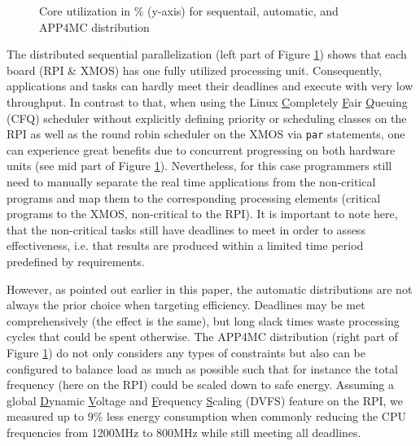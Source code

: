 \documentclass [a4paper,final,conference,10pt]{IDAACS}
\begin{document}
\begin{figure}[t!]
	\vspace{-10pt}
	\caption{Core utilization in \% (y-axis) for sequentail, automatic, and APP4MC distribution}
	\label{fig:dischart}
\end{figure}
The distributed sequential parallelization (left part of Figure \ref{fig:dischart}) shows that each board (RPI \& XMOS) has one fully utilized processing unit. Consequently, applications and tasks can hardly meet their deadlines and execute with very low throughput. In contrast to that, when using the Linux \underline{C}ompletely \underline{F}air \underline{Q}ueuing (CFQ) scheduler without explicitly defining priority or scheduling classes %
on the RPI as well as the round robin scheduler on the XMOS via \texttt{par} statements, one can experience great benefits due to concurrent progressing on both hardware units (see mid part of Figure \ref{fig:dischart}). Nevertheless, for this case programmers still need to manually separate the real time applications from the non-critical programs and map them to the corresponding processing elements (critical programs to the XMOS, non-critical to the RPI). It is important to note here, that the non-critical tasks still have deadlines to meet in order to assess effectiveness, i.e. that results are produced within a limited time period predefined by requirements.

However, as pointed out earlier in this paper, the automatic distributions are not always the prior choice when targeting efficiency. Deadlines may be met comprehensively (the effect is the same), but long slack times waste processing cycles that could be spent otherwise. The APP4MC distribution (right part of Figure \ref{fig:dischart}) do not only considers any types of constraints but also can be configured to balance load as much as possible such that for instance the total frequency (here on the RPI) could be scaled down to safe energy. Assuming a global \underline{D}ynamic \underline{V}oltage and \underline{F}requency \underline{S}caling (DVFS) feature on the RPI, we measured up to 9\% less energy consumption when commonly reducing the CPU frequencies from 1200MHz to 800MHz while still meeting all deadlines.  %
\end{document}
